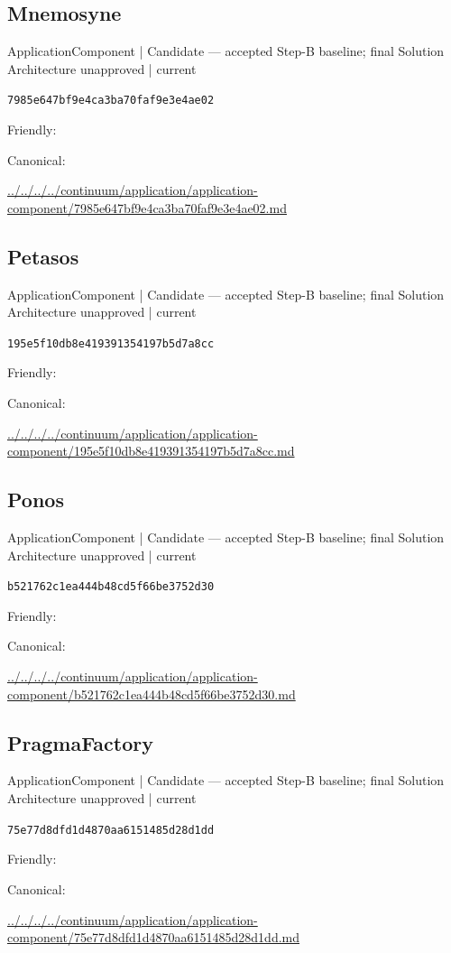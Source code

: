 \documentclass[10pt,a4paper]{article}
\begin{document}
\subsection*{Mnemosyne}
{\small ApplicationComponent | Candidate — accepted Step-B baseline; final Solution Architecture unapproved | current}\par
\texttt{7985e647bf9e4ca3ba70faf9e3e4ae02}\par
Friendly: \par
Canonical: \par
{\footnotesize\url{../../../../continuum/application/application-component/7985e647bf9e4ca3ba70faf9e3e4ae02.md}}\par
\subsection*{Petasos}
{\small ApplicationComponent | Candidate — accepted Step-B baseline; final Solution Architecture unapproved | current}\par
\texttt{195e5f10db8e419391354197b5d7a8cc}\par
Friendly: \par
Canonical: \par
{\footnotesize\url{../../../../continuum/application/application-component/195e5f10db8e419391354197b5d7a8cc.md}}\par
\subsection*{Ponos}
{\small ApplicationComponent | Candidate — accepted Step-B baseline; final Solution Architecture unapproved | current}\par
\texttt{b521762c1ea444b48cd5f66be3752d30}\par
Friendly: \par
Canonical: \par
{\footnotesize\url{../../../../continuum/application/application-component/b521762c1ea444b48cd5f66be3752d30.md}}\par
\subsection*{PragmaFactory}
{\small ApplicationComponent | Candidate — accepted Step-B baseline; final Solution Architecture unapproved | current}\par
\texttt{75e77d8dfd1d4870aa6151485d28d1dd}\par
Friendly: \par
Canonical: \par
{\footnotesize\url{../../../../continuum/application/application-component/75e77d8dfd1d4870aa6151485d28d1dd.md}}\par
\end{document}
